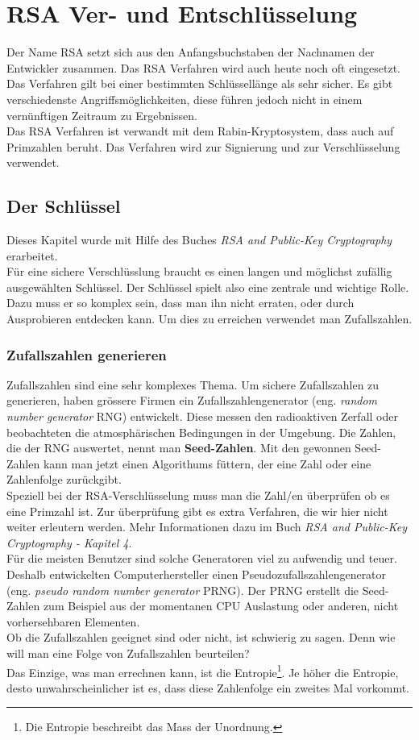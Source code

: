 \newpage
\section{RSA Ver- und Entschlüsselung}
Der Name RSA setzt sich aus den Anfangsbuchstaben der Nachnamen der Entwickler zusammen. Das RSA Verfahren wird auch heute noch oft eingesetzt. Das Verfahren gilt bei einer bestimmten Schlüssellänge als sehr sicher. Es gibt verschiedenste Angriffsmöglichkeiten, diese führen jedoch nicht in einem vernünftigen Zeitraum zu Ergebnissen.\\
Das RSA Verfahren ist verwandt mit dem Rabin-Kryptosystem, dass auch auf Primzahlen beruht. Das Verfahren wird zur Signierung und zur Verschlüsselung verwendet. %

\subsection{Der Schlüssel}
Dieses Kapitel wurde mit Hilfe des Buches \textit{RSA and Public-Key Cryptography} erarbeitet.\\[2ex]
%
Für eine sichere Verschlüsslung braucht es einen langen und möglichst zufällig ausgewählten Schlüssel. Der Schlüssel spielt also eine zentrale und wichtige Rolle. Dazu muss er so komplex sein, dass man ihn nicht erraten, oder durch Ausprobieren entdecken kann. Um dies zu erreichen verwendet man Zufallszahlen.
%
\subsubsection{Zufallszahlen generieren}
Zufallszahlen sind eine sehr komplexes Thema. Um sichere Zufallszahlen zu generieren, haben grössere Firmen ein Zufallszahlengenerator (eng. \textit{random number generator} RNG) entwickelt. Diese messen den radioaktiven Zerfall oder beobachteten die atmosphärischen Bedingungen in der Umgebung. Die Zahlen, die der RNG auswertet, nennt man \textbf{Seed-Zahlen}. Mit den gewonnen Seed-Zahlen kann man jetzt einen Algorithums füttern, der eine Zahl oder eine Zahlenfolge zurückgibt.\\
Speziell bei der RSA-Verschlüsselung muss man die Zahl/en überprüfen ob es eine Primzahl ist. Zur überprüfung gibt es extra Verfahren, die wir hier nicht weiter erleutern werden. Mehr Informationen dazu im Buch \textit{RSA and Public-Key Cryptography - Kapitel 4}.\\
%
Für die meisten Benutzer sind solche Generatoren viel zu aufwendig und teuer. Deshalb entwickelten Computerhersteller einen Pseudozufallszahlengenerator (eng. \textit{pseudo random number generator} PRNG). Der PRNG erstellt die Seed-Zahlen zum Beispiel aus der momentanen CPU Auslastung oder anderen, nicht vorhersehbaren Elementen.\\
Ob die Zufallszahlen geeignet sind oder nicht, ist schwierig zu sagen. Denn wie will man eine Folge von Zufallszahlen beurteilen?\\
Das Einzige, was man errechnen kann, ist die Entropie\footnote{Die Entropie beschreibt das Mass der Unordnung.}. Je höher die Entropie, desto unwahrscheinlicher ist es, dass diese Zahlenfolge ein zweites Mal vorkommt.
